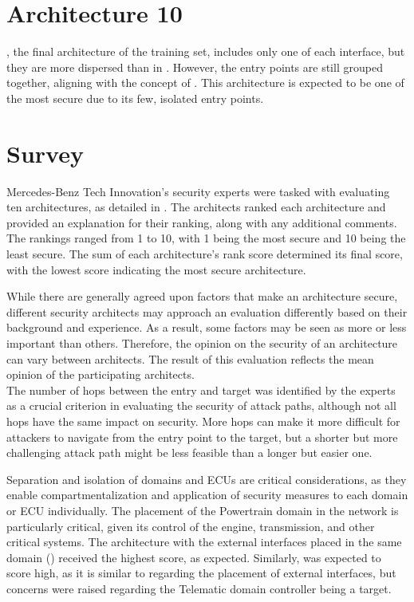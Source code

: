 \section{Architecture 10}
\label{subsec:arch10}

, the final architecture of the training set, includes only one of each interface, 
but they are more dispersed than in . 
However, the entry points are still grouped together, aligning with the concept of . 
This architecture is expected to be one of the most secure due to its few, isolated entry points.

\section{Survey}
\label{sec:survey}

Mercedes-Benz Tech Innovation's security experts were tasked with evaluating ten architectures, 
as detailed in . The architects ranked each architecture and provided an explanation 
for their ranking, along with any additional comments. 
The rankings ranged from 1 to 10, with 1 being the most secure and 10 being the least secure. 
The sum of each architecture's rank score determined its final score, 
with the lowest score indicating the most secure architecture.

While there are generally agreed upon factors that make an architecture secure, 
different security architects may approach an evaluation differently based on their background and experience. 
As a result, some factors may be seen as more or less important than others. 
Therefore, the opinion on the security of an architecture can vary between architects. 
The result of this evaluation reflects the mean opinion of the participating architects.\\

The number of hops between the entry and target was identified by the experts as a 
crucial criterion in evaluating the security of attack paths, although not all hops have the same impact on security. 
More hops can make it more difficult for attackers to navigate from the entry point to the target, 
but a shorter but more challenging attack path might be less feasible than a longer but easier one. 

Separation and isolation of domains and ECUs are critical considerations, 
as they enable compartmentalization and application of security measures to each domain or ECU individually. 
The placement of the Powertrain domain in the network is particularly critical, 
given its control of the engine, transmission, and other critical systems. 
The architecture with the external interfaces placed in the same domain () 
received the highest score, as expected. Similarly,  was expected to score high, 
as it is similar to  regarding the placement of external interfaces, but
concerns were raised regarding the Telematic domain controller being a target.


